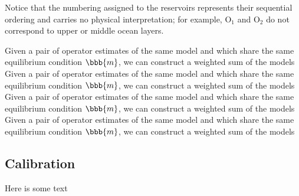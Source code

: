  Notice that the numbering assigned to the reservoirs represents their sequential ordering and carries no physical interpretation; for example, $\text{O}_1$ and $\text{O}_2$ do not correspond to upper or middle ocean layers.












%
Given a pair of operator estimates of the same model  and which share the same  equilibrium condition $ \bbb{m}$, we can construct a weighted sum of the models  
Given a pair of operator estimates of the same model  and which share the same  equilibrium condition $ \bbb{m}$, we can construct a weighted sum of the models  
Given a pair of operator estimates of the same model  and which share the same  equilibrium condition $ \bbb{m}$, we can construct a weighted sum of the models  
Given a pair of operator estimates of the same model  and which share the same  equilibrium condition $ \bbb{m}$, we can construct a weighted sum of the models  








\newpage
\subsection{Calibration}
Here is some text

